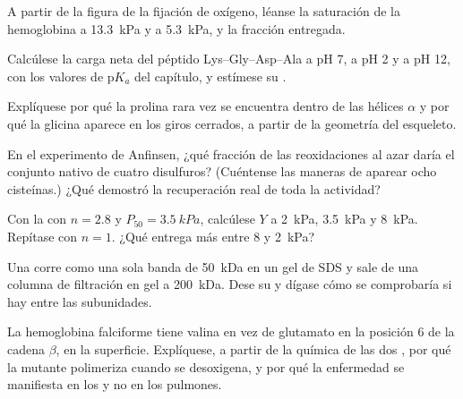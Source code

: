 \begin{exercise}[$\star$]\label{exo:b1:proteins:4}
A partir de la figura de la fijación de oxígeno, léanse la saturación de la
hemoglobina a \qty{13.3}{kPa} y a \qty{5.3}{kPa}, y la fracción entregada.
\end{exercise}

\begin{exercise}[$\star\star$]\label{exo:b1:proteins:5}
Calcúlese la carga neta del péptido Lys--Gly--Asp--Ala a pH 7, a pH 2 y a
pH 12, con los valores de p$K_a$ del capítulo, y estímese su .
\end{exercise}

\begin{exercise}[$\star\star$]\label{exo:b1:proteins:6}
Explíquese por qué la prolina rara vez se encuentra dentro de las hélices
$\alpha$ y por qué la glicina aparece en los giros cerrados, a partir de la
geometría del esqueleto.
\end{exercise}

\begin{exercise}[$\star\star$]\label{exo:b1:proteins:7}
En el experimento de Anfinsen, ¿qué fracción de las reoxidaciones al azar
daría el conjunto nativo de cuatro disulfuros? (Cuéntense las maneras de
aparear ocho cisteínas.) ¿Qué demostró la recuperación real de toda la
actividad?
\end{exercise}

\begin{exercise}[$\star\star$]\label{exo:b1:proteins:8}
Con la  con $n = 2.8$ y $P_{50} = \qty{3.5}{kPa}$,
calcúlese $Y$ a \qty{2}{kPa}, \qty{3.5}{kPa} y \qty{8}{kPa}. Repítase con
$n = 1$. ¿Qué  entrega más entre \qty{8}{} y \qty{2}{kPa}?
\end{exercise}

\begin{exercise}[$\star\star$]\label{exo:b1:proteins:9}
Una  corre como una sola banda de \qty{50}{kDa} en un gel de SDS y
sale de una columna de filtración en gel a \qty{200}{kDa}. Dese su
 y dígase cómo se comprobaría si hay 
entre las subunidades.
\end{exercise}

\begin{exercise}[$\star\star\star$]\label{exo:b1:proteins:10}
La hemoglobina falciforme tiene valina en vez de glutamato en la posición 6
de la cadena $\beta$, en la superficie. Explíquese, a partir de la química
de las dos , por qué la  mutante polimeriza cuando
se desoxigena, y por qué la enfermedad se manifiesta en los  y no en
los pulmones.
\end{exercise}


